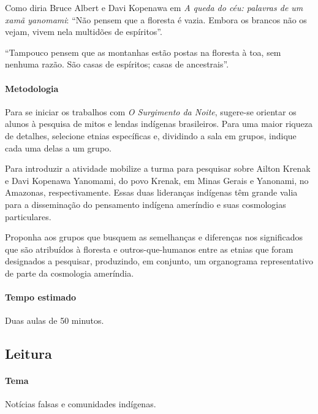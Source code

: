 \documentclass[12pt]{extarticle}
\begin{document}
Como diria Bruce Albert e Davi Kopenawa em \textit{A queda do céu: palavras de 
um xamã yanomami}: ``Não pensem que a floresta é vazia. Embora os brancos não os 
vejam, vivem nela multidões de espíritos''.

``Tampouco pensem que as montanhas estão postas na floresta à toa, sem nenhuma razão. 
São casas de espíritos; casas de ancestrais''.

\paragraph{Metodologia} 


Para se iniciar os trabalhos com \emph{O Surgimento
da Noite}, sugere-se orientar os alunos à pesquisa de mitos e lendas
indígenas brasileiros. Para uma maior riqueza de detalhes, selecione
etnias específicas e, dividindo a sala em grupos, indique cada uma delas
a um grupo. 

Para introduzir a atividade mobilize a turma para pesquisar sobre Ailton 
Krenak e Davi Kopenawa Yanomami, do povo Krenak, em Minas Gerais e Yanonami,
no Amazonas, respectivamente. Essas duas lideranças indígenas têm grande valia 
para a disseminação do pensamento indígena ameríndio e suas cosmologias particulares.

Proponha aos grupos que busquem as semelhanças e diferenças nos significados que são 
atribuídos à floresta e outros-que-humanos entre as etnias que foram designados a pesquisar,
produzindo, em conjunto, um organograma representativo de parte da cosmologia ameríndia.  



\paragraph{Tempo estimado} Duas aulas de 50 minutos. 


\subsection{Leitura}


\paragraph{Tema} Notícias falsas e comunidades indígenas.
\end{document}
